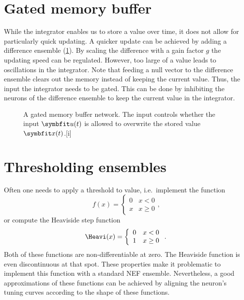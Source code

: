 \section{Gated memory buffer}
While the integrator enables us to store a value over time, it does not allow for particularly quick updating.
A quicker update can be achieved by adding a difference ensemble (\cref{fig:gated-mem}).
By scaling the difference with a gain factor $g$ the updating speed can be regulated.
However, too large of a value leads to oscillations in the integrator.
Note that feeding a null vector to the difference ensemble clears out the memory instead of keeping the current value.
Thus, the input the integrator needs to be gated.
This can be done by inhibiting the neurons of the difference ensemble to keep the current value in the integrator.
\begin{figure}
    \begin{captionbeside}{A gated memory buffer network. The  input controls whether the input $\vc u(t)$ is allowed to overwrite the stored value $\vc x(t)$.\label{fig:gated-mem}}[i]
\end{captionbeside}
\end{figure}

\section{Thresholding ensembles}\label{sec:thresholding}
Often one needs to apply a threshold to value, i.e.\ implement the function
\begin{equation}
    f(x) = \left\{ \begin{array}{ll}
            0 & x < 0 \\
            x & x \geq 0
        \end{array} \right.
    \text{,}
\end{equation}
or compute the Heaviside step function
\begin{equation}
    \Heavi(x) = \left\{ \begin{array}{ll}
            0 & x < 0 \\
            1 & x \geq 0
        \end{array} \right.
    \text{.}
\end{equation}
Both of these functions are non-differentiable at zero.
The Heaviside function is even discontinuous at that spot.
These properties make it problematic to implement this function with a standard NEF ensemble.
Nevertheless, a good approximations of these functions can be achieved by aligning the neuron's tuning curves according to the shape of these functions.

